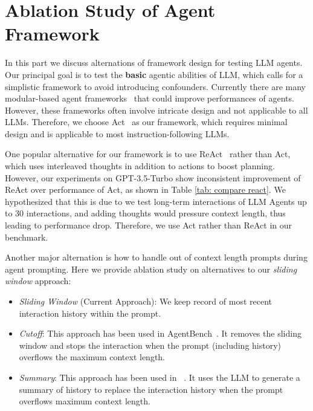 \section{Ablation Study of Agent Framework\label{sec: ablation study}}

In this part we discuss  alternations of framework design for testing LLM agents. Our principal goal is to test the \textbf{basic} agentic abilities of LLM, which calls for a simplistic framework to avoid introducing confounders. Currently there are many modular-based agent frameworks~\citep{wang2023voyager, hong2023metagpt, wu2024copilot} that could improve performances of agents. However, these frameworks often involve intricate design and not applicable to all LLMs. Therefore, we choose Act~\citep{yao2022react} as our framework, which requires minimal design and is applicable to most instruction-following LLMs.



One popular alternative for our framework is to use ReAct~\citep{yao2022react} rather than Act, which uses interleaved thoughts in addition to actions to boost planning. However, our experiments on GPT-3.5-Turbo show inconsistent improvement of ReAct over performance of Act, as shown in Table \ref{tab: compare react}. We hypothesized that this is due to we test long-term interactions of LLM Agents up to 30 interactions, and adding thoughts would pressure context length, thus leading to performance drop. Therefore, we use Act rather than ReAct in our benchmark.

Another major alternation is how to handle out of context length prompts during agent prompting. Here we provide ablation study on alternatives to our \textit{sliding window} approach: 

\begin{itemize}
    \item \emph{Sliding Window }(Current Approach): We keep record of most recent interaction history within the prompt. 
    \item \emph{Cutoff}: This approach has been used in AgentBench~\citep{liu2023agentbench}. It removes the sliding window and stops the interaction when the prompt (including history) overflows the maximum context length. 
    \item \emph{Summary}: This approach has been used in ~\citet{xu2023gentopia, Chase_LangChain_2022}. It uses the LLM to generate a summary of history to replace the interaction history when the prompt overflows maximum context length. 
\end{itemize}


